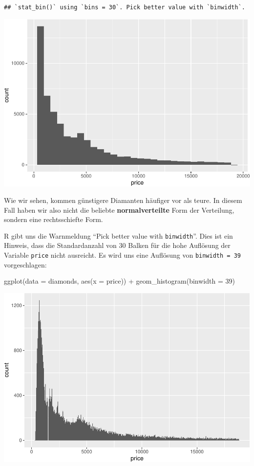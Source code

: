 \documentclass[
]{book}
\newenvironment{Shaded}{\begin{snugshade}}{\end{snugshade}}
\newcommand{\AttributeTok}[1]{\textcolor[rgb]{0.77,0.63,0.00}{#1}}
\newcommand{\DecValTok}[1]{\textcolor[rgb]{0.00,0.00,0.81}{#1}}
\newcommand{\FunctionTok}[1]{\textcolor[rgb]{0.00,0.00,0.00}{#1}}
\newcommand{\NormalTok}[1]{#1}
\newcommand{\SpecialCharTok}[1]{\textcolor[rgb]{0.00,0.00,0.00}{#1}}
\begin{document}
\begin{verbatim}
## `stat_bin()` using `bins = 30`. Pick better value with `binwidth`.
\end{verbatim}

\includegraphics{CFH_R_bookdown_files/figure-latex/unnamed-chunk-161-1.pdf}

Wie wir sehen, kommen günstigere Diamanten häufiger vor als teure. In diesem Fall haben wir also nicht die beliebte \textbf{normalverteilte} Form der Verteilung, sondern eine rechtsschiefte Form.

R gibt uns die Warnmeldung ``Pick better value with \texttt{binwidth}''. Dies ist ein Hinweis, dass die Standardanzahl von 30 Balken für die hohe Auflösung der Variable \texttt{price} nicht ausreicht. Es wird uns eine Auflösung von \texttt{binwidth\ =\ 39} vorgeschlagen:

\begin{Shaded}
\begin{Highlighting}[]
\FunctionTok{ggplot}\NormalTok{(}\AttributeTok{data =}\NormalTok{ diamonds, }\FunctionTok{aes}\NormalTok{(}\AttributeTok{x =}\NormalTok{ price)) }\SpecialCharTok{+}
  \FunctionTok{geom\_histogram}\NormalTok{(}\AttributeTok{binwidth =} \DecValTok{39}\NormalTok{)}
\end{Highlighting}
\end{Shaded}

\includegraphics{CFH_R_bookdown_files/figure-latex/unnamed-chunk-162-1.pdf}
\end{document}
